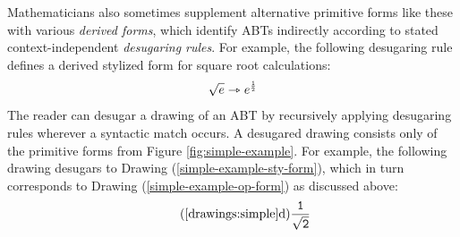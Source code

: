 Mathematicians also sometimes supplement alternative primitive forms like these with various \emph{derived forms}, which  identify ABTs indirectly according to stated context-independent \emph{desugaring rules}. For example, the following desugaring rule defines a derived stylized form for square root calculations:
\begin{equation}\label{rule:simplelang-sqrt}
\sqrt{e} \rightarrowtriangle e^{\frac{\numintro{1}}{\numintro{2}}}
\end{equation}
The reader can desugar a drawing of an ABT by recursively applying desugaring rules wherever a syntactic match occurs. A desugared drawing consists only of the {primitive forms} from Figure \ref{fig:simple-example}. 
For example, the following drawing desugars to Drawing (\ref{simple-example-sty-form}), which in turn corresponds to Drawing (\ref{simple-example-op-form}) as discussed above:
\begin{equation*}\tag{\ref*{drawings:simple}d}
\frac{\numintro{1}}{\sqrt{\numintro{2}}}
\end{equation*}


